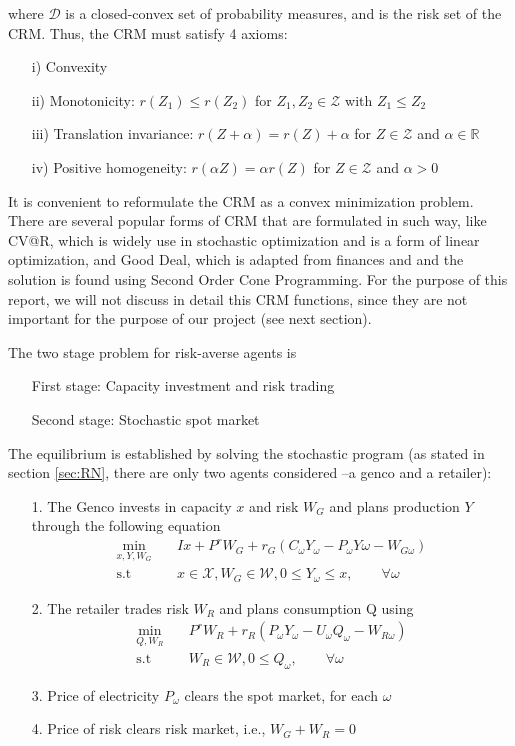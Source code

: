 \documentclass[11pt, letterpaper]{article}
\begin{document}
where $\mathcal{D}$ is a closed-convex set of probability measures, and is the risk set of the CRM. Thus, the CRM must satisfy 4 axioms:
\begin{itemize}
    \item[i)] Convexity
    \item[ii)] Monotonicity: $r(Z_1) \leq r(Z_2)$ for $Z_1, Z_2 \in \mathcal{Z}$ with $Z_1 \leq Z_2$
    \item[iii)] Translation invariance: $r(Z + \alpha ) = r(Z) + \alpha$ for $Z \in \mathcal{Z}$ and $\alpha \in \mathbb{R}$
    \item[iv)] Positive homogeneity: $r(\alpha Z) = \alpha r(Z)$ for $Z \in \mathcal{Z}$ and $\alpha > 0$
\end{itemize}

It is convenient to reformulate the CRM as a convex minimization problem. There are several popular forms of CRM that are formulated in such way,  like CV@R, which is widely use in stochastic optimization and is a form of linear optimization, and Good Deal, which is adapted from finances and and the solution is found using Second Order Cone Programming. For the purpose of this report, we will not discuss in detail this CRM functions, since they are not important for the purpose of our project (see next section). 
\smallskip

The two stage problem for risk-averse agents is 
\begin{itemize}
    \item[] First stage: Capacity investment and risk trading
    \item[] Second stage: Stochastic spot market
\end{itemize}

The equilibrium is established by solving the stochastic program (as stated in section \ref{sec:RN}, there are only two agents considered --a genco and a retailer):

\begin{itemize}
    \item[1.] The Genco invests in capacity $x$ and risk $W_G$ and plans production $Y$ through the following equation
    \begin{align}
        \min_{x,Y,W_G} & \quad  Ix + P^r W_G + r_G(C_\omega Y_\omega - P_\omega Y\omega - W_{G \omega})\\
        \textrm{s.t} & \quad x \in \mathcal{X}, W_G \in \mathcal{W}, 0 \leq Y_\omega \leq x,  \qquad \forall \omega
    \end{align}
    
    \item[2.] The retailer trades risk $W_R$ and plans consumption Q using
    \begin{align}
        \min_{Q,W_R} & \quad P^r W_R + r_R ( P_\omega Y_\omega - U_\omega Q_\omega -W_{R\omega})\\
        \textrm{s.t} & \quad W_R \in \mathcal{W}, 0 \leq Q_\omega, \qquad  \forall \omega
    \end{align}
    \item[3.] Price of electricity $P_\omega$ clears the spot market, for each $\omega$
    \item[4.] Price of risk clears risk market, i.e., $W_G + W_R = 0$
\end{itemize}
\end{document}
